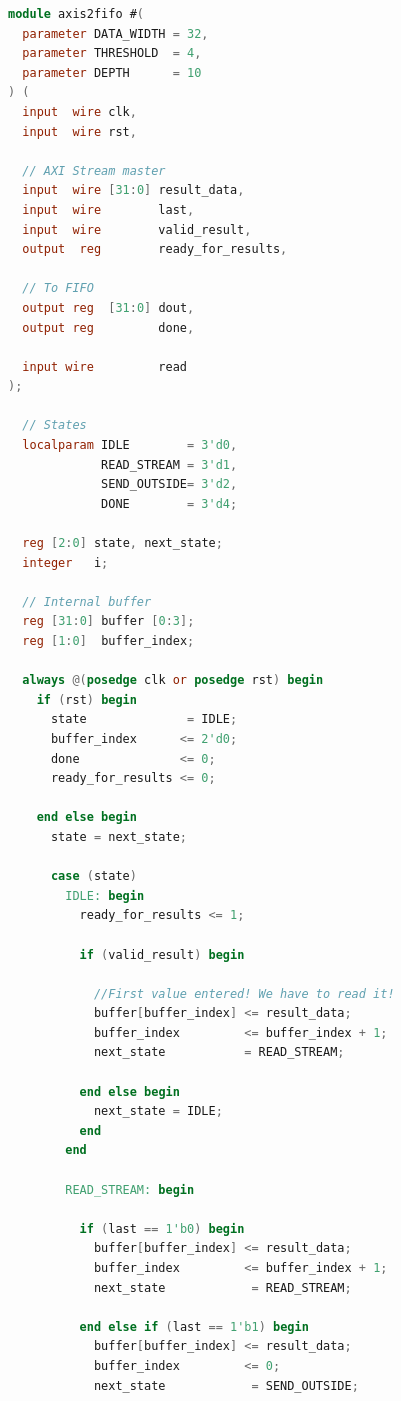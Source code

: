 \begin{lstlisting}[language=verilog,frame=single,caption={Código fuente en Verilog del módulo conversor de AXI al formato de datos origen},showstringspaces=false,label=lst:verilogAxis2fifo]
module axis2fifo #(
  parameter DATA_WIDTH = 32,
  parameter THRESHOLD  = 4,
  parameter DEPTH      = 10
) (
  input  wire clk,
  input  wire rst,

  // AXI Stream master
  input  wire [31:0] result_data,
  input  wire        last,
  input  wire	     valid_result,
  output  reg	     ready_for_results,

  // To FIFO
  output reg  [31:0] dout,
  output reg         done,
  
  input wire 		 read
);

  // States
  localparam IDLE        = 3'd0,
             READ_STREAM = 3'd1,
             SEND_OUTSIDE= 3'd2,
             DONE        = 3'd4;

  reg [2:0] state, next_state;
  integer   i;

  // Internal buffer
  reg [31:0] buffer [0:3];
  reg [1:0]  buffer_index;

  always @(posedge clk or posedge rst) begin
    if (rst) begin
      state              = IDLE;
      buffer_index      <= 2'd0;
      done              <= 0;
      ready_for_results <= 0;

    end else begin
      state = next_state;

      case (state)
        IDLE: begin
          ready_for_results <= 1;
          
          if (valid_result) begin
            
            //First value entered! We have to read it!
            buffer[buffer_index] <= result_data;
            buffer_index         <= buffer_index + 1;
            next_state           = READ_STREAM;
            
          end else begin
            next_state = IDLE;
          end
        end

        READ_STREAM: begin
          
          if (last == 1'b0) begin
            buffer[buffer_index] <= result_data;
            buffer_index         <= buffer_index + 1;
            next_state            = READ_STREAM;

          end else if (last == 1'b1) begin
            buffer[buffer_index] <= result_data;
            buffer_index         <= 0;
            next_state            = SEND_OUTSIDE;


\end{lstlisting}
